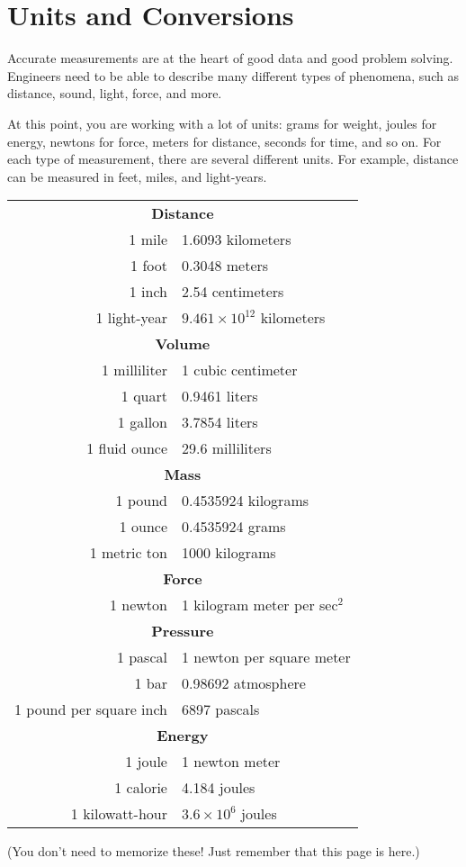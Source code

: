 \chapter{Units and Conversions}

Accurate measurements are at the heart of good data and good problem solving. Engineers need to be able to describe many different types of phenomena, such as distance, sound, light, force, and more.

At this point, you are working with a lot of units: grams for weight,
joules for energy, newtons for force, meters for distance, seconds for
time, and so on. For each type of measurement, there are several different
units. For example, distance can be measured in feet, miles,
and light-years.

\begin{mdframed}[style=important, frametitle={Some Equalencies}]

\begin{tabular}{r | l}
  \hline
  \multicolumn{2}{c}{\textbf{Distance}}\\
  1 mile & 1.6093 kilometers \\
  1 foot & 0.3048 meters \\
  1 inch & 2.54 centimeters \\
  1 light-year & $9.461 \times 10^{12}$ kilometers\\
  \hline
  \multicolumn{2}{c}{\textbf{Volume}}\\
  1 milliliter & 1 cubic centimeter \\
  1 quart & 0.9461 liters \\
  1 gallon & 3.7854 liters \\
  1 fluid ounce & 29.6 milliliters \\
  \hline
  \multicolumn{2}{c}{\textbf{Mass}}\\
  1 pound & 0.4535924 kilograms\\
  1 ounce & 0.4535924 grams\\
  1 metric ton & 1000 kilograms \\
  \hline
  \multicolumn{2}{c}{\textbf{Force}}\\
  1 newton & 1 kilogram meter per sec$^2$\\
  \hline
  \multicolumn{2}{c}{\textbf{Pressure}}\\
  1 pascal & 1 newton per square meter \\
  1 bar & 0.98692 atmosphere \\
  1 pound per square inch & 6897 pascals \\
  \hline
  \multicolumn{2}{c}{\textbf{Energy}}\\
  1 joule & 1 newton meter \\
  1 calorie & 4.184 joules \\
  1 kilowatt-hour & $3.6 \times 10^{6}$ joules  \\
\end{tabular}

(You don't need to memorize these! Just remember that this page is here.)

\end{mdframed}

